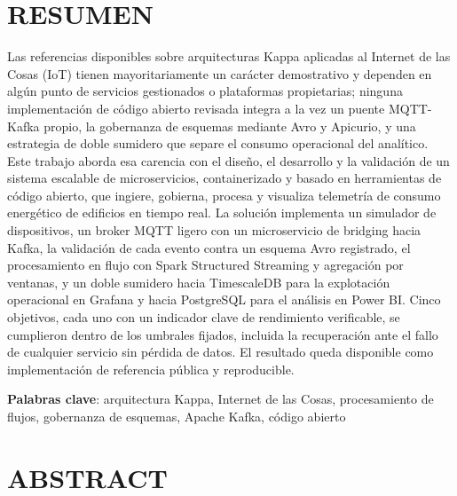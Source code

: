 \chapter*{RESUMEN}
\label{chp:abstract}

Las referencias disponibles sobre arquitecturas Kappa aplicadas al Internet de las Cosas (IoT) tienen mayoritariamente un carácter demostrativo y dependen en algún punto de servicios gestionados o plataformas propietarias; ninguna implementación de código abierto revisada integra a la vez un puente MQTT-Kafka propio, la gobernanza de esquemas mediante Avro y Apicurio, y una estrategia de doble sumidero que separe el consumo operacional del analítico. Este trabajo aborda esa carencia con el diseño, el desarrollo y la validación de un sistema escalable de microservicios, containerizado y basado en herramientas de código abierto, que ingiere, gobierna, procesa y visualiza telemetría de consumo energético de edificios en tiempo real. La solución implementa un simulador de dispositivos, un broker MQTT ligero con un microservicio de bridging hacia Kafka, la validación de cada evento contra un esquema Avro registrado, el procesamiento en flujo con Spark Structured Streaming y agregación por ventanas, y un doble sumidero hacia TimescaleDB para la explotación operacional en Grafana y hacia PostgreSQL para el análisis en Power BI. Cinco objetivos, cada uno con un indicador clave de rendimiento verificable, se cumplieron dentro de los umbrales fijados, incluida la recuperación ante el fallo de cualquier servicio sin pérdida de datos. El resultado queda disponible como implementación de referencia pública y reproducible.

\textbf{Palabras clave}: arquitectura Kappa, Internet de las Cosas, procesamiento de flujos, gobernanza de esquemas, Apache Kafka, código abierto

\chapter*{ABSTRACT}

